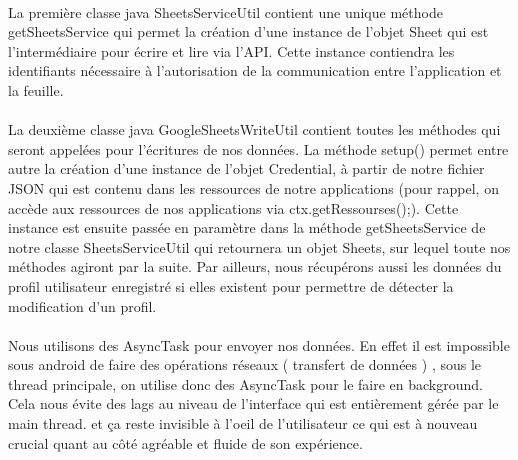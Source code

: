 \documentclass[a4paper, 10pt]{article}
\begin{document}
\paragraph{}
La première classe java SheetsServiceUtil contient une unique méthode getSheetsService qui permet la création d’une instance de l’objet Sheet qui est l'intermédiaire pour écrire et lire via l’API. Cette instance contiendra les identifiants nécessaire à l’autorisation de la communication entre l’application et la feuille.
\paragraph{}
La deuxième classe java GoogleSheetsWriteUtil contient toutes les méthodes qui seront appelées pour l’écritures de nos données. 
La méthode setup() permet entre autre la création d’une instance de l’objet Credential, à partir de notre fichier JSON qui est contenu dans les ressources de notre applications (pour rappel, on accède aux ressources de nos applications via ctx.getRessourses();). Cette instance est ensuite passée en paramètre dans la méthode getSheetsService de notre classe SheetsServiceUtil qui retournera un objet Sheets, sur lequel toute nos méthodes agiront par la suite.
Par ailleurs, nous récupérons aussi les données du profil utilisateur enregistré si elles existent pour permettre de détecter la modification d’un profil.
\paragraph{}
Nous utilisons des AsyncTask pour envoyer nos données. En effet il est impossible sous android de faire des opérations réseaux ( transfert de données ) , sous le thread principale, on utilise donc des AsyncTask pour le faire en background. Cela nous évite des lags au niveau de l’interface qui est entièrement gérée par le main thread.
et ça reste invisible à l’oeil de l’utilisateur ce qui est à nouveau crucial quant au côté agréable et fluide de son expérience.
\end{document}
